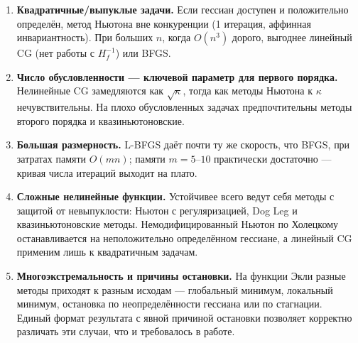 \documentclass[a4paper,12pt]{article}
\theoremstyle{definition}
\begin{document}
\begin{enumerate}
    \item \textbf{Квадратичные/выпуклые задачи.} Если гессиан доступен и положительно определён,
          метод Ньютона вне конкуренции (1 итерация, аффинная инвариантность). При больших $n$,
          когда $O(n^3)$ дорого, выгоднее линейный CG (нет работы с $H_f^{-1}$) или BFGS.

    \item \textbf{Число обусловленности — ключевой параметр для первого порядка.} Нелинейные CG
          замедляются как $\sqrt{\kappa}$, тогда как методы Ньютона к $\kappa$ нечувствительны.
          На плохо обусловленных задачах предпочтительны методы второго порядка и квазиньютоновские.

    \item \textbf{Большая размерность.} L-BFGS даёт почти ту же скорость, что BFGS, при затратах
          памяти $O(mn)$; памяти $m = 5\text{--}10$ практически достаточно — кривая числа итераций
          выходит на плато.

    \item \textbf{Сложные нелинейные функции.} Устойчивее всего ведут себя методы с защитой от
          невыпуклости: Ньютон с регуляризацией, Dog Leg и квазиньютоновские методы.
          Немодифицированный Ньютон по Холецкому останавливается на неположительно определённом
          гессиане, а линейный CG применим лишь к квадратичным задачам.

    \item \textbf{Многоэкстремальность и причины остановки.} На функции Экли разные методы
          приходят к разным исходам — глобальный минимум, локальный минимум, остановка по
          неопределённости гессиана или по стагнации. Единый формат результата с явной причиной
          остановки позволяет корректно различать эти случаи, что и требовалось в работе.
\end{enumerate}
\end{document}
